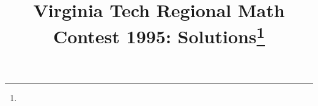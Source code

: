 \documentclass[10pt]{article}
\begin{document}
\title{Virginia Tech Regional Math Contest 1995: Solutions\footnote{\disclaimer}}
\author{\vspace{-2ex}}
\date{\vspace{-5ex}} %
\maketitle

%

%

%

%

%

%

%
\end{document}
